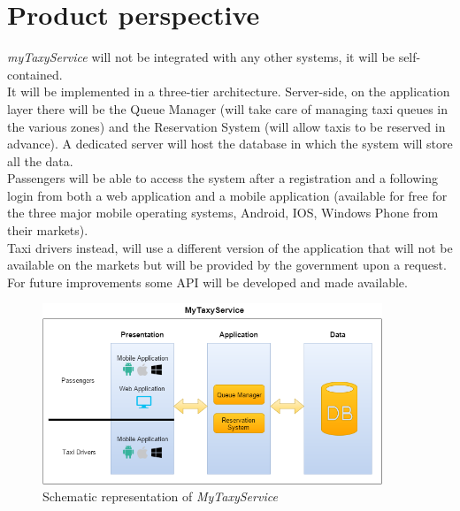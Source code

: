 \section{Product perspective}
\textit{myTaxyService} will not be integrated with any other systems, it will be self-contained.\\
It will be implemented in a three-tier architecture. Server-side, on the application layer there will be the Queue Manager (will take care of managing taxi queues in the various zones) and the Reservation System (will allow taxis to be reserved in advance). A dedicated server will host the database in which the system will store all the data.\\
Passengers will be able to access the system after a registration and a following login from both a web application and a mobile application (available for free for the three major mobile operating systems, Android, IOS, Windows Phone from their markets).\\
Taxi drivers instead, will use a different version of the application that will not be available on the markets but will be provided by the government upon a request.
For future improvements some API will be developed and made available.

\begin{figure}[h]
	\centering
	\includegraphics[width=4in]{Images/system_diagram}
	\caption{Schematic representation of \textit{MyTaxyService}}
\end{figure}